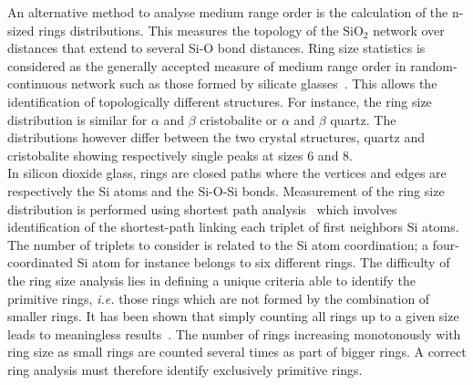 \documentclass[aps,10pt,twocolumn]{revtex4}
\makeatletter
\newcommand{\ie}{\emph{i.e.}\@\xspace}
\newcommand{\mrm}[1]{\ensuremath{\mathrm{#1}}\xspace}
\newcommand{\SiOTwo}{\ensuremath{\mrm{SiO_2}}\xspace}
\makeatother
\begin{document}
An alternative method to analyse medium range order is the calculation of the n-sized rings
distributions. This measures the topology of the \SiOTwo network over distances that extend to
several Si-O bond distances. Ring size statistics is considered as the generally accepted
measure of medium range order in random-continuous network such as those formed by silicate
glasses~\cite{WeaireWooten80,TadrosKlenin85,GrenecheTeillet85,LuedtkeLandman89}. This 
allows the identification of topologically different structures. For instance,  the ring size
distribution is similar for $\alpha$ and $\beta$ cristobalite or $\alpha$ and $\beta$ quartz.
The distributions however differ  between the two crystal structures, quartz and cristobalite
showing respectively single peaks at sizes 6 and 8.\\
In silicon dioxide glass, rings are closed paths where the vertices and edges are respectively
the Si atoms and the Si-O-Si bonds. Measurement of the ring size distribution is performed using shortest
path analysis~\cite{WrightDesa78} which involves identification of
the shortest-path linking each triplet of first neighbors Si atoms. The number of triplets to consider is
related to the Si atom coordination; a four-coordinated Si atom for instance belongs to six different rings.
The difficulty of the ring size analysis lies in defining a unique criteria able to identify the
primitive rings, \ie those rings which are not formed by the combination of smaller rings. It has been
shown that simply counting all rings up to a given size leads to meaningless
results~\cite{WeaireWooten80,TadrosKlenin85,LuedtkeLandman89}. The number of rings 
increasing monotonously with ring size as small rings are counted several times as part of
bigger rings. A correct ring analysis must therefore identify exclusively primitive rings.\\
\end{document}
